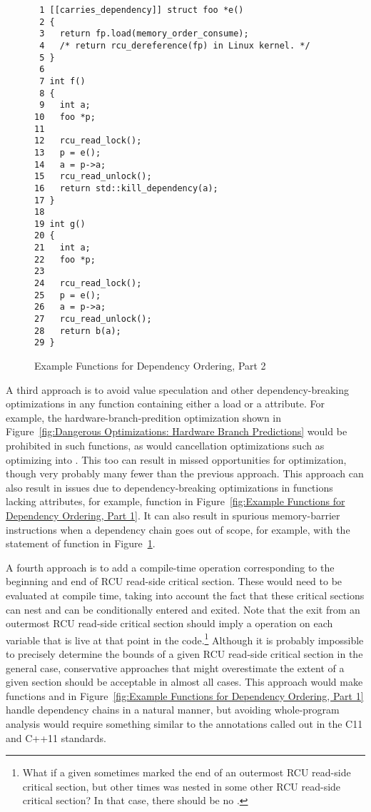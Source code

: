 \documentclass[letterpaper,twocolumn,10pt]{article}
\begin{document}
\begin{figure}[tbp]
{ \scriptsize
\begin{verbatim}
 1 [[carries_dependency]] struct foo *e()
 2 {
 3   return fp.load(memory_order_consume);
 4   /* return rcu_dereference(fp) in Linux kernel. */
 5 }
 6 
 7 int f()
 8 {
 9   int a;
10   foo *p;
11 
12   rcu_read_lock();
13   p = e();
14   a = p->a;
15   rcu_read_unlock();
16   return std::kill_dependency(a);
17 }
18 
19 int g()
20 {
21   int a;
22   foo *p;
23 
24   rcu_read_lock();
25   p = e();
26   a = p->a;
27   rcu_read_unlock();
28   return b(a);
29 }
\end{verbatim}
}
\caption{Example Functions for Dependency Ordering, Part 2}
\label{fig:Example Functions for Dependency Ordering, Part 2}
\end{figure}

A third approach is to avoid value speculation and other dependency-breaking
optimizations in any function containing either a 
load or a  attribute.
For example, the hardware-branch-predition optimization shown in
Figure~\ref{fig:Dangerous Optimizations: Hardware Branch Predictions}
would be prohibited in such functions, as would cancellation optimizations
such as optimizing  into .
This too can result in missed opportunities for optimization, though
very probably many fewer than the previous approach.
This approach can also result in issues due to dependency-breaking
optimizations in functions lacking  attributes,
for example, function  in
Figure~\ref{fig:Example Functions for Dependency Ordering, Part 1}.
It can also result in spurious memory-barrier instructions when
a dependency chain goes out of scope, for example, with the
 statement of function  in
Figure~\ref{fig:Example Functions for Dependency Ordering, Part 2}.

A fourth approach is to add a compile-time operation corresponding to
the beginning and end of RCU read-side critical section.
These would need to be evaluated at compile time, taking into account
the fact that these critical sections can nest and can be conditionally
entered and exited.
Note that the exit from an outermost RCU read-side critical section
should imply a  operation on each
variable that is live at that point in the code.\footnote{
	What if a given  sometimes marked the
	end of an outermost RCU read-side critical section, but other
	times was nested in some other RCU read-side critical section?
	In that case, there should be no .}
Although it is probably impossible to precisely determine the bounds
of a given RCU read-side critical section in the general case,
conservative approaches that might overestimate the extent of
a given section should be acceptable in almost all cases.
This approach would make functions  and  in
Figure~\ref{fig:Example Functions for Dependency Ordering, Part 1}
handle dependency chains in a natural manner, but avoiding
whole-program analysis would require something similar to the
 annotations called out in the
C11 and C++11 standards.
\end{document}
